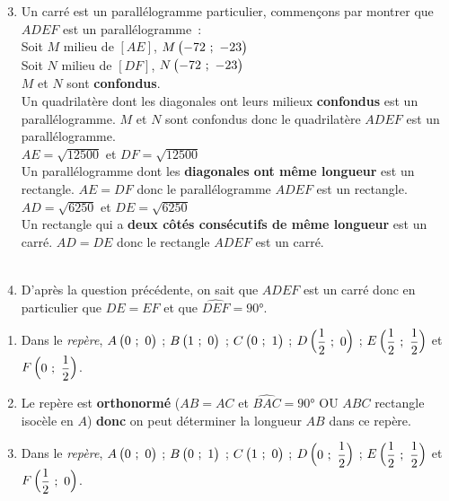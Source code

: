 \vspace*{-2em}

\newpage

\begin{minipage}{0.45\textwidth}
\thispagestyle{correction1}

\vspace*{1em}

\begin{enumerate}
	\setcounter{enumi}{2}
	\item Un carré est un parallélogramme particulier, commençons par montrer que $ADEF$ est un parallélogramme~:\\
			Soit $M$ milieu de $[AE]$, $M\begin{pmatrix}-72~;~-23\end{pmatrix}$\\
			Soit $N$ milieu de $[DF]$, $N\begin{pmatrix}-72~;~-23\end{pmatrix}$\\
			$M$ et $N$ sont \textbf{confondus}.\\
			Un quadrilatère dont les diagonales ont leurs milieux \textbf{confondus} est un parallélogramme. $M$ et $N$ sont confondus donc le quadrilatère $ADEF$ est un parallélogramme.\\[1em]
			$AE = \sqrt{12500}$ et $DF = \sqrt{12500}$\\
			Un parallélogramme dont les \textbf{diagonales ont même longueur} est un rectangle. $AE = DF$ donc le parallélogramme $ADEF$ est un rectangle.\\[1em]
			$AD = \sqrt{6250}$ et $DE = \sqrt{6250}$\\			
			Un rectangle qui a \textbf{deux côtés consécutifs de même longueur} est un carré. $AD = DE$ donc le rectangle $ADEF$ est un carré.\\
			
			\\
	\item D'après la question précédente, on sait que $ADEF$ est un carré donc en particulier que $DE = EF$ et que $\widehat{DEF} = 90°$.\\[1em]
\end{enumerate}

\exercice
\begin{enumerate}
	\item Dans le \emph{repère}, $A\begin{pmatrix}0~;~0\end{pmatrix}$ ; $B\begin{pmatrix}1~;~0\end{pmatrix}$ ; $C\begin{pmatrix}0~;~1\end{pmatrix}$ ; $D\begin{pmatrix}\dfrac{1}{2}~;~0\end{pmatrix}$ ; $E\begin{pmatrix}\dfrac{1}{2}~;~\dfrac{1}{2}\end{pmatrix}$ et $F\begin{pmatrix}0~;~\dfrac{1}{2}\end{pmatrix}$.
	\item Le repère est \textbf{orthonormé} ($AB = AC$ et $\widehat{BAC} = 90°$ OU $ABC$ rectangle isocèle en $A$) \textbf{donc} on peut déterminer la longueur $AB$ dans ce repère.
	\item Dans le \emph{repère}, $A\begin{pmatrix}0~;~0\end{pmatrix}$ ; $B\begin{pmatrix}0~;~1\end{pmatrix}$ ; $C\begin{pmatrix}1~;~0\end{pmatrix}$ ; $D\begin{pmatrix}0~;~\dfrac{1}{2}\end{pmatrix}$ ; $E\begin{pmatrix}\dfrac{1}{2}~;~\dfrac{1}{2}\end{pmatrix}$ et $F\begin{pmatrix}\dfrac{1}{2}~;~0\end{pmatrix}$.
\end{enumerate}

\end{minipage}

